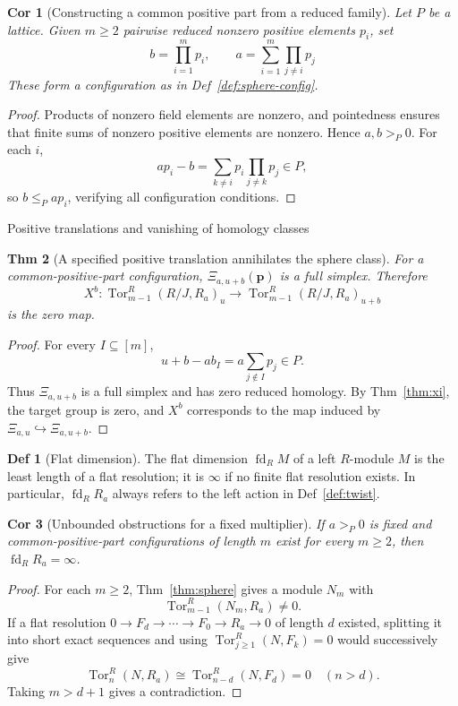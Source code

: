 \documentclass[10pt,letterpaper]{amsart}
\makeatletter
\numberwithin{equation}{section}
\newtheorem{thm}{Thm}[section]
\newtheorem{cor}[thm]{Cor}
\theoremstyle{definition}
\newtheorem{defn}{Def}[section]
\newcommand{\Tor}{\operatorname{Tor}}
\newcommand{\fd}{\operatorname{fd}}
\def\subsection{\@startsection{subsection}{2}
  \z@{.9\linespacing\@plus.3\linespacing}{.4\linespacing}
  {\normalfont\fontsize{11.5}{14}\selectfont\bfseries\boldmath\raggedright}}
\makeatother
\begin{document}
\begin{cor}[Constructing a common positive part from a reduced family]\label{cor:sphere-polynomial}
Let $P$ be a lattice. Given $m\ge2$ pairwise reduced nonzero positive elements $p_i$, set
\[
b=\prod_{i=1}^mp_i,\qquad
a=\sum_{i=1}^m\prod_{j\ne i}p_j
\]
These form a configuration as in Def~\ref{def:sphere-config}.
\end{cor}
\begin{proof}
Products of nonzero field elements are nonzero, and pointedness ensures that finite sums of nonzero positive elements are nonzero. Hence $a,b>_P0$. For each $i$,
\[
ap_i-b=\sum_{k\ne i}p_i\prod_{j\ne k}p_j\in P,
\]
so $b\le_Pap_i$, verifying all configuration conditions.
\end{proof}

\subsection{Positive translations and vanishing of homology classes}
\begin{thm}[A specified positive translation annihilates the sphere class]\label{thm:death}
For a common-positive-part configuration, $\Xi_{a,u+b}(\mathbf p)$ is a full simplex. Therefore
\[
X^b:\Tor_{m-1}^R(R/J,R_a)_u
\longrightarrow\Tor_{m-1}^R(R/J,R_a)_{u+b}
\]
is the zero map.
\end{thm}
\begin{proof}
For every $I\subseteq[m]$,
\[
u+b-ab_I=a\sum_{j\notin I}p_j\in P.
\]
Thus $\Xi_{a,u+b}$ is a full simplex and has zero reduced homology. By Thm~\ref{thm:xi}, the target group is zero, and $X^b$ corresponds to the map induced by $\Xi_{a,u}\hookrightarrow\Xi_{a,u+b}$.
\end{proof}

\begin{defn}[Flat dimension]\label{def:flat-dimension}
The flat dimension $\fd_RM$ of a left $R$-module $M$ is the least length of a flat resolution; it is $\infty$ if no finite flat resolution exists. In particular, $\fd_RR_a$ always refers to the left action in Def~\ref{def:twist}.
\end{defn}

\begin{cor}[Unbounded obstructions for a fixed multiplier]\label{cor:infinite-fd}
If $a>_P0$ is fixed and common-positive-part configurations of length $m$ exist for every $m\ge2$, then $\fd_RR_a=\infty$.
\end{cor}
\begin{proof}
For each $m\ge2$, Thm~\ref{thm:sphere} gives a module $N_m$ with
\[
\Tor_{m-1}^R(N_m,R_a)\ne0.
\]
If a flat resolution $0\to F_d\to\cdots\to F_0\to R_a\to0$ of length $d$ existed, splitting it into short exact sequences and using $\Tor_{j\ge1}^R(N,F_k)=0$ would successively give
\[
\Tor_n^R(N,R_a)\cong\Tor_{n-d}^R(N,F_d)=0\quad(n>d).
\]
Taking $m>d+1$ gives a contradiction.
\end{proof}
\end{document}
